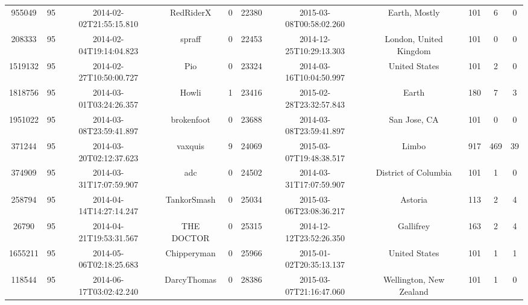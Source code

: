 \documentclass[12pt,a4paper,twoside,openright,titlepage,final]{article}
\begin{document}
\begin{enumerate}
\begin{table}[htbp!]
{\begin{tabular}{@{}ccccccccccc@{}}
			955049             & 95           & 2014-02-02T21:55:15.810 & RedRiderX            & 0                  & 22380       & 2015-03-08T00:58:02.260 & Earth, Mostly           & 101                 & 6                & 0              \\
			208333             & 95           & 2014-02-04T19:14:04.823 & spraff               & 0                  & 22453       & 2014-12-25T10:29:13.303 & London, United Kingdom  & 101                 & 0                & 0              \\
			1519132            & 95           & 2014-02-27T10:50:00.727 & Pio                  & 0                  & 23324       & 2014-03-16T10:04:50.997 & United States           & 101                 & 2                & 0              \\
			1818756            & 95           & 2014-03-01T03:24:26.357 & Howli                & 1                  & 23416       & 2015-02-28T23:32:57.843 & Earth                   & 180                 & 7                & 3              \\
			1951022            & 95           & 2014-03-08T23:59:41.897 & brokenfoot           & 0                  & 23688       & 2014-03-08T23:59:41.897 & San Jose, CA            & 101                 & 0                & 0              \\
			371244             & 95           & 2014-03-20T02:12:37.623 & vaxquis              & 9                  & 24069       & 2015-03-07T19:48:38.517 & Limbo                   & 917                 & 469              & 39             \\
			374909             & 95           & 2014-03-31T17:07:59.907 & adc                  & 0                  & 24502       & 2014-03-31T17:07:59.907 & District of Columbia    & 101                 & 1                & 0              \\
			258794             & 95           & 2014-04-14T14:27:14.247 & TankorSmash          & 0                  & 25034       & 2015-03-06T23:08:36.217 & Astoria                 & 113                 & 2                & 4              \\
			26790              & 95           & 2014-04-21T19:53:31.567 & THE DOCTOR           & 0                  & 25315       & 2014-12-12T23:52:26.350 & Gallifrey               & 163                 & 2                & 4              \\
			1655211            & 95           & 2014-05-06T02:18:25.683 & Chipperyman          & 0                  & 25966       & 2015-01-02T20:35:13.137 & United States           & 101                 & 1                & 1              \\
			118544             & 95           & 2014-06-17T03:02:42.240 & DarcyThomas          & 0                  & 28386       & 2015-03-07T21:16:47.060 & Wellington, New Zealand & 101                 & 1                & 0              \\ \bottomrule
			\end{tabular}%
		}
	\end{table}
	
	
\end{enumerate}
\end{document}

